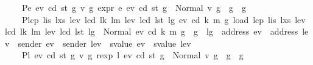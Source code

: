 \begin{isabellebody}
\ \ \ \ {\isacharquery}{\kern0pt}P{}{\isachardot}{\kern0pt}{}{\isacharequal}{\kern0pt}{\isachardoublequoteopen}{\isasymlambda}e{}\ ev{}\ cd{}\ st{}\ g{}{\isachardot}{\kern0pt}\ {\isacharparenleft}{\kern0pt}{\isasymforall}v{}{\isacharprime}{\kern0pt}\ g{}{\isacharprime}{\kern0pt}{\isachardot}{\kern0pt}\ expr\ e{}\ ev{}\ cd{}\ st{}\ g{}\ {\isacharequal}{\kern0pt}\ Normal\ {\isacharparenleft}{\kern0pt}v{}{\isacharprime}{\kern0pt}{\isacharcomma}{\kern0pt}\ g{}{\isacharprime}{\kern0pt}{\isacharparenright}{\kern0pt}\ {\isasymlongrightarrow}\ g{}{\isacharprime}{\kern0pt}\ {\isasymle}\ g{}{\isacharparenright}{\kern0pt}{\isachardoublequoteclose}\isanewline
\ \ \ \ {\isacharquery}{\kern0pt}P{}{\isachardot}{\kern0pt}{}{\isacharequal}{\kern0pt}{\isachardoublequoteopen}{\isasymlambda}lcp\ lis\ lxs\ lev{}\ lcd{}\ lk\ lm\ lev\ lcd\ lst\ lg{\isachardot}{\kern0pt}\ {\isacharparenleft}{\kern0pt}{\isasymforall}ev\ cd\ k\ m\ g{\isacharprime}{\kern0pt}{\isachardot}{\kern0pt}\ load\ lcp\ lis\ lxs\ lev{}\ lcd{}\ lk\ lm\ lev\ lcd\ lst\ lg\ {\isacharequal}{\kern0pt}\ Normal\ {\isacharparenleft}{\kern0pt}{\isacharparenleft}{\kern0pt}ev{\isacharcomma}{\kern0pt}\ cd{\isacharcomma}{\kern0pt}\ k{\isacharcomma}{\kern0pt}\ m{\isacharparenright}{\kern0pt}{\isacharcomma}{\kern0pt}\ g{\isacharprime}{\kern0pt}{\isacharparenright}{\kern0pt}\ {\isasymlongrightarrow}\ g{\isacharprime}{\kern0pt}\ {\isasymle}\ lg\ {\isasymand}\ address\ ev\ {\isacharequal}{\kern0pt}\ address\ lev{}\ {\isasymand}\ sender\ ev\ {\isacharequal}{\kern0pt}\ sender\ lev{}\ {\isasymand}\ svalue\ ev\ {\isacharequal}{\kern0pt}\ svalue\ lev{}{\isacharparenright}{\kern0pt}{\isachardoublequoteclose}\isanewline
\ \ \ \ {\isacharquery}{\kern0pt}P{}{\isachardot}{\kern0pt}{}{\isacharequal}{\kern0pt}{\isachardoublequoteopen}{\isasymlambda}l{}\ ev{}\ cd{}\ st{}\ g{}{\isachardot}{\kern0pt}\ {\isacharparenleft}{\kern0pt}{\isasymforall}v{}{\isacharprime}{\kern0pt}\ g{}{\isacharprime}{\kern0pt}{\isachardot}{\kern0pt}\ rexp\ l{}\ ev{}\ cd{}\ st{}\ g{}\ {\isacharequal}{\kern0pt}\ Normal\ {\isacharparenleft}{\kern0pt}v{}{\isacharprime}{\kern0pt}{\isacharcomma}{\kern0pt}\ g{}{\isacharprime}{\kern0pt}{\isacharparenright}{\kern0pt}\ {\isasymlongrightarrow}\ g{}{\isacharprime}{\kern0pt}\ {\isasymle}\ g{}{\isacharparenright}{\kern0pt}{\isachardoublequoteclose}\isanewline

\end{isabellebody}
